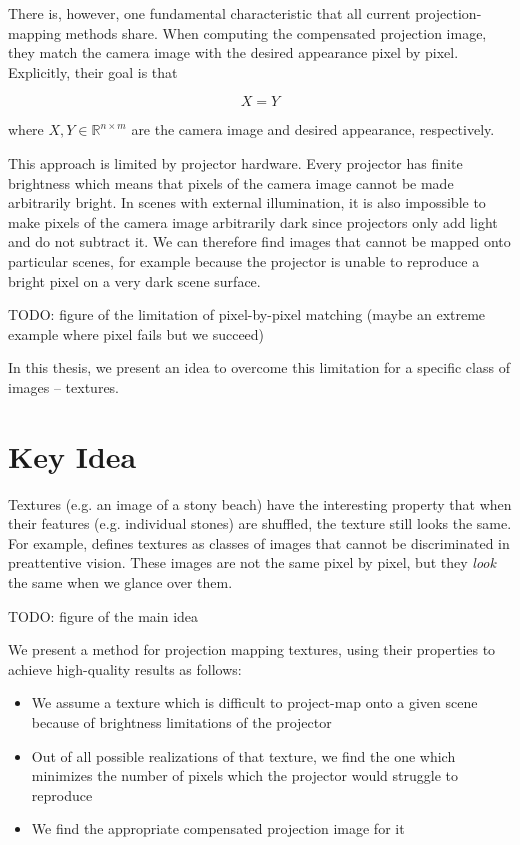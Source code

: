 There is, however, one fundamental characteristic that all current projection-mapping methods share. When computing the compensated projection image, they match the camera image with the desired appearance pixel by pixel. Explicitly, their goal is that

\begin{equation}
    \label{eq:projection_mapping-per_pixel}
    X = Y
\end{equation}

where \(X,Y \in \mathbb{R}^{n \times m}\) are the camera image and desired appearance, respectively.

This approach is limited by projector hardware. Every projector has finite brightness which means that pixels of the camera image cannot be made arbitrarily bright. In scenes with external illumination, it is also impossible to make pixels of the camera image arbitrarily dark since projectors only add light and do not subtract it. We can therefore find images that cannot be mapped onto particular scenes, for example because the projector is unable to reproduce a bright pixel on a very dark scene surface.

{\color{red} TODO: figure of the limitation of pixel-by-pixel matching (maybe an extreme example where pixel fails but we succeed)}

In this thesis, we present an idea to overcome this limitation for a specific class of images -- textures.

\section{Key Idea}
\label{section:intro-key_idea}

Textures (e.g. an image of a stony beach) have the interesting property that when their features (e.g. individual stones) are shuffled, the texture still looks the same. For example, \citet*{Julesz1995} defines textures as classes of images that cannot be discriminated in preattentive vision. These images are not the same pixel by pixel, but they \textit{look} the same when we glance over them.

{\color{red} TODO: figure of the main idea}

We present a method for projection mapping textures, using their properties to achieve high-quality results as follows:

\begin{itemize}
    \item We assume a texture which is difficult to project-map onto a given scene because of brightness limitations of the projector
    \item Out of all possible realizations of that texture, we find the one which minimizes the number of pixels which the projector would struggle to reproduce
    \item We find the appropriate compensated projection image for it
\end{itemize}

